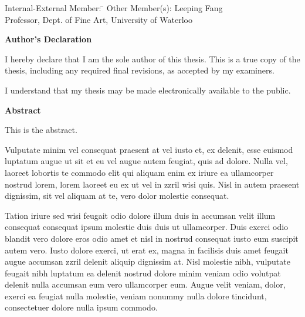   \noindent
\begin{tabbing}
Internal-External Member: \=  \kill %
Other Member(s): \> Leeping Fang \\
\> Professor, Dept. of Fine Art, University of Waterloo \\
\end{tabbing}

\cleardoublepage

 \begin{center}\textbf{Author's Declaration}\end{center}
  
 \noindent
I hereby declare that I am the sole author of this thesis. This is a true copy of the thesis, including any required final revisions, as accepted by my examiners.

  \bigskip
  
  \noindent
I understand that my thesis may be made electronically available to the public.

\cleardoublepage


\begin{center}\textbf{Abstract}\end{center}

This is the abstract.

Vulputate minim vel consequat praesent at vel iusto et, ex delenit, esse euismod luptatum augue ut sit et eu vel augue autem feugiat, quis ad dolore. Nulla vel, laoreet lobortis te commodo elit qui aliquam enim ex iriure ea ullamcorper nostrud lorem, lorem laoreet eu ex ut vel in zzril wisi quis. Nisl in autem praesent dignissim, sit vel aliquam at te, vero dolor molestie consequat.

Tation iriure sed wisi feugait odio dolore illum duis in accumsan velit illum consequat consequat ipsum molestie duis duis ut ullamcorper. Duis exerci odio blandit vero dolore eros odio amet et nisl in nostrud consequat iusto eum suscipit autem vero. Iusto dolore exerci, ut erat ex, magna in facilisis duis amet feugait augue accumsan zzril delenit aliquip dignissim at. Nisl molestie nibh, vulputate feugait nibh luptatum ea delenit nostrud dolore minim veniam odio volutpat delenit nulla accumsan eum vero ullamcorper eum. Augue velit veniam, dolor, exerci ea feugiat nulla molestie, veniam nonummy nulla dolore tincidunt, consectetuer dolore nulla ipsum commodo.

